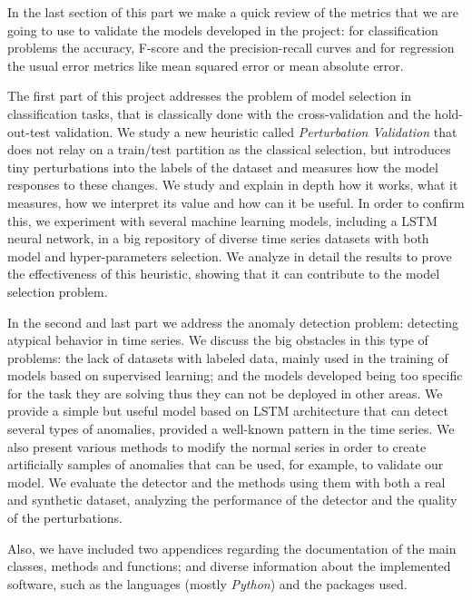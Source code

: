 In the last section of this part we make a quick review of the metrics that we are going to use to validate the models developed in the project: for classification problems the accuracy, F-score and the precision-recall curves and for regression the usual error metrics like mean squared error or mean absolute error.

The first part of this project addresses the problem of model selection in classification tasks, that is classically done with the cross-validation and the hold-out-test validation. We study a new heuristic called \emph{Perturbation Validation} that does not relay on a train/test partition as the classical selection, but introduces tiny perturbations into the labels of the dataset and measures how the model responses to these changes. We study and explain in depth how it works, what it measures, how we interpret its value and how can it be useful. In order to confirm this, we experiment with several machine learning models, including a LSTM neural network, in a big repository of diverse time series datasets with both model and hyper-parameters selection. We analyze in detail the results to prove the effectiveness of this heuristic, showing that it can contribute to the model selection problem.

In the second and last part we address the anomaly detection problem: detecting atypical behavior in time series. We discuss the big obstacles in this type of problems: the lack of datasets with labeled data, mainly used in the training of models based on supervised learning; and the models developed being too specific for the task they are solving thus they can not be deployed in other areas. We provide a simple but useful model based on LSTM architecture that can detect several types of anomalies, provided a well-known pattern in the time series. We also present various methods to modify the normal series in order to create artificially samples of anomalies that can be used, for example, to validate our model. We evaluate the detector and the methods using them with both a real and synthetic dataset, analyzing the performance of the detector and the quality of the perturbations.

Also, we have included two appendices regarding the documentation of the main classes, methods and functions; and diverse information about the implemented software, such as the languages (mostly \emph{Python}) and the packages used.

